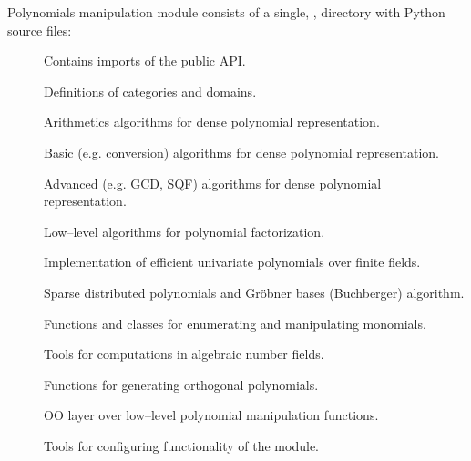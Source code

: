 Polynomials manipulation module consists of a single, ,  directory with Python source
files:
\begin{description}
\item[] \leavevmode
Contains imports of the public API.

\item[] \leavevmode
Definitions of categories and domains.

\item[] \leavevmode
Arithmetics algorithms for dense polynomial representation.

\item[] \leavevmode
Basic (e.g. conversion) algorithms for dense polynomial representation.

\item[] \leavevmode
Advanced (e.g. GCD, SQF) algorithms for dense polynomial representation.

\item[] \leavevmode
Low--level algorithms for polynomial factorization.

\item[] \leavevmode
Implementation of efficient univariate polynomials over finite fields.

\item[] \leavevmode
Sparse distributed polynomials and Gröbner bases (Buchberger) algorithm.

\item[] \leavevmode
Functions and classes for enumerating and manipulating monomials.

\item[] \leavevmode
Tools for computations in algebraic number fields.

\item[] \leavevmode
Functions for generating orthogonal polynomials.

\item[] \leavevmode
OO layer over low--level polynomial manipulation functions.

\item[] \leavevmode
Tools for configuring functionality of the module.


\end{description}
